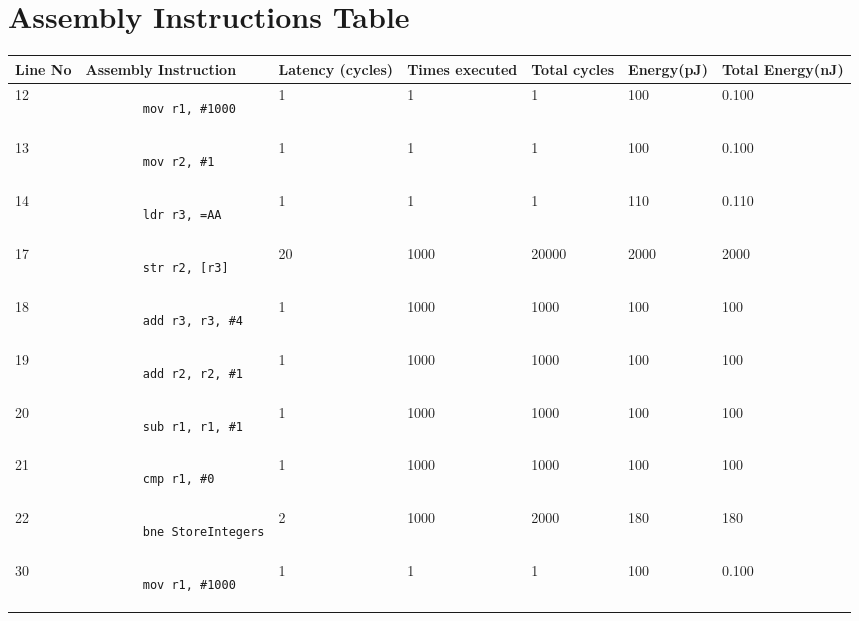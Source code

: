 \documentclass[]{article}
\begin{document}
\section{Assembly Instructions Table}
\large
\begin{center}
	\begin{tabular}{ |p{0.6cm}|l||p{1.5cm}|p{1cm}|p{1.5cm}|p{1.25cm}|p{2cm}||  }
		\hline
			Line No & Assembly Instruction	&	Latency (cycles)	&	Times executed	&	Total cycles	&	Energy\newline(pJ)	&	Total Energy(\textbf{nJ})	\\
		\hline
		12 & \begin{lstlisting}
		mov r1, #1000
		\end{lstlisting}&1&1&1&100&0.100	\\
		13 & \begin{lstlisting}
		mov r2, #1
		\end{lstlisting}&1&1&1&100&0.100	\\
		14 & \begin{lstlisting}
		ldr r3, =AA
		\end{lstlisting}&1&1&1&110&0.110	\\
		17 & \begin{lstlisting}
		str r2, [r3]
		\end{lstlisting}&20&1000&20000&2000&2000 \\
		18 & \begin{lstlisting}
		add r3, r3, #4
		\end{lstlisting}&1&1000&1000&100&100 \\
		19 & \begin{lstlisting}
		add r2, r2, #1
		\end{lstlisting}&1&1000&1000&100&100 \\
		20 & \begin{lstlisting}
		sub r1, r1, #1
		\end{lstlisting}&1&1000&1000&100&100 \\
		21 & \begin{lstlisting}
		cmp r1, #0
		\end{lstlisting}&1&1000&1000&100&100 \\
		22 & \begin{lstlisting}
		bne StoreIntegers
		\end{lstlisting}&2&1000&2000&180&180 \\
		30 & \begin{lstlisting}
		mov r1, #1000
		\end{lstlisting}&1&1&1&100&0.100	\\

\end{tabular}
\end{center}
\end{document}
